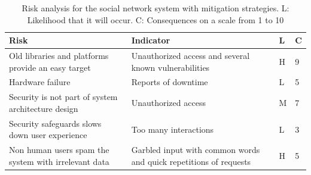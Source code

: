 \documentclass[a4paper]{article}
\begin{document}
\begin{table}[h!]
	\begin{tabular}{| p{5cm} | p{5cm} | l | l |}
		\hline
		\textbf{Risk} & \textbf{Indicator} & \textbf{L} & \textbf{C}  \\ \hline
        Old libraries and platforms provide an easy target & Unauthorized access and several known vulnerabilities \cite{CVEdb} & H & 9 \\\hline
        Hardware failure & Reports of downtime & L & 5 \\ \hline
        Security is not part of system architecture design & Unauthorized access & M & 7 \\ \hline
		Security safeguards slows down user experience & Too many interactions & L & 3
		\\ \hline
		Non human users spam the system with irrelevant data & Garbled input with common words and quick repetitions of requests & H & 5
				\\ \hline
	\end{tabular}
	\caption{Risk analysis for the social network system with mitigation strategies. L: Likelihood that it will occur. C: Consequences on a scale from 1 to 10}
	\label{tab:risk_analysis}
	

\end{table}
\end{document}

